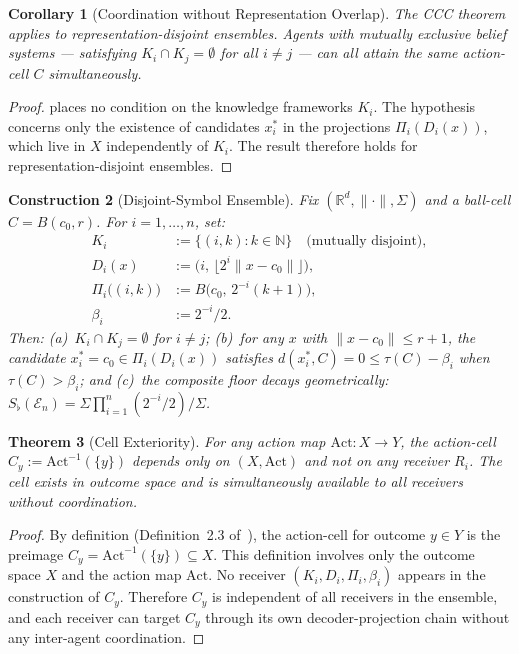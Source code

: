 \documentclass[twocolumn,11pt,a4paper]{article}
\newtheorem{theorem}{Theorem}[section]
\newtheorem{corollary}[theorem]{Corollary}
\newtheorem{construction}[theorem]{Construction}
\theoremstyle{remark}
\newcommand{\R}{\mathbb{R}}
\newcommand{\N}{\mathbb{N}}
\newcommand{\Sflat}{S_{\flat}}
\newcommand{\Act}{\mathrm{Act}}
\newcommand{\tol}{\tau}
\newcommand{\Ens}{\mathcal{E}}            %
\begin{document}
\begin{corollary}[Coordination without Representation Overlap]
\label{cor:coord-no-overlap}
The CCC theorem applies to representation-disjoint ensembles.  Agents with
mutually exclusive belief systems — satisfying $K_i \cap K_j = \emptyset$
for all $i \neq j$ — can all attain the same action-cell $C$ simultaneously.
\end{corollary}
\begin{proof}
 places no condition on the knowledge frameworks $K_i$.
The hypothesis concerns only the existence of candidates $x_i^*$ in the
projections $\Pi_i(D_i(x))$, which live in $X$ independently of $K_i$.
The result therefore holds for representation-disjoint ensembles.
\end{proof}

\begin{construction}[Disjoint-Symbol Ensemble]
\label{const:disjoint}
Fix $({\R}^d, \|\cdot\|, \Sigma)$ and a ball-cell $C = B(c_0, r)$.  For
$i = 1, \ldots, n$, set:
\begin{align*}
  K_i &:= \{(i,k) : k \in \N\} \quad \text{(mutually disjoint)},\\
  D_i(x) &:= \bigl(i,\, \lfloor 2^i \|x - c_0\| \rfloor\bigr),\\
  \Pi_i\bigl((i,k)\bigr) &:= B\bigl(c_0,\, 2^{-i}(k+1)\bigr),\\
  \beta_i &:= 2^{-i}/2.
\end{align*}
Then: (a)~$K_i \cap K_j = \emptyset$ for $i \neq j$; (b)~for any $x$ with
$\|x - c_0\| \le r + 1$, the candidate $x_i^* = c_0 \in \Pi_i(D_i(x))$
satisfies $d(x_i^*, C) = 0 \le \tol(C) - \beta_i$ when $\tol(C) > \beta_i$;
and (c)~the composite floor decays geometrically: $\Sflat(\Ens_n) = \Sigma
\prod_{i=1}^n (2^{-i}/2)/\Sigma$.
\end{construction}

\begin{theorem}[Cell Exteriority]
\label{thm:cell-exteriority}
For any action map $\Act: X \to Y$, the action-cell $C_y := \Act^{-1}(\{y\})$
depends only on $(X, \Act)$ and not on any receiver $R_i$.  The cell exists
in outcome space and is simultaneously available to all receivers without
coordination.
\end{theorem}
\begin{proof}
By definition (Definition~2.3 of~\cite{sachikonye2025agents}), the
action-cell for outcome $y \in Y$ is the preimage $C_y = \Act^{-1}(\{y\})
\subseteq X$.  This definition involves only the outcome space $X$ and
the action map $\Act$.  No receiver $(K_i, D_i, \Pi_i, \beta_i)$ appears
in the construction of $C_y$.  Therefore $C_y$ is independent of all
receivers in the ensemble, and each receiver can target $C_y$ through
its own decoder-projection chain without any inter-agent coordination.
\end{proof}
\end{document}
